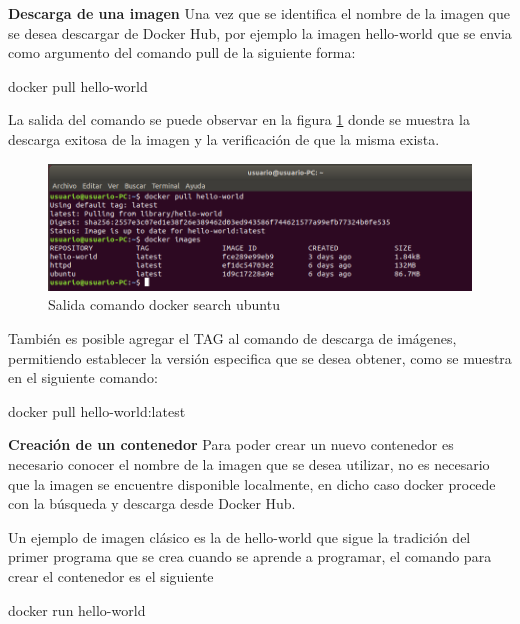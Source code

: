 \textbf{Descarga de una imagen}
Una vez que se identifica el nombre de la imagen que se desea descargar de Docker Hub, por ejemplo la imagen hello-world que se envia como argumento del comando pull de la siguiente forma:
\begin{commandshell} docker pull hello-world \end{commandshell}

La salida del comando se puede observar en la figura \ref{fig:DockerGestion5} donde se muestra la descarga exitosa de la imagen y la verificación de que la misma exista. 

\begin{figure}[!hbtp]
	\centering
	\includegraphics[width=\linewidth]{RE05_Docker/Gestion_basica/REDocker_Gestion5.png}
	\vspace{-0.2cm}
	\caption{Salida comando docker search ubuntu}
	\label{fig:DockerGestion5}
\end{figure}

También es posible agregar el TAG al comando de descarga de imágenes, permitiendo establecer la versión especifica que se desea obtener, como se muestra en el siguiente comando:

\begin{commandshell} docker pull hello-world:latest \end{commandshell}

\textbf{Creación de un contenedor}
Para poder crear un nuevo contenedor es necesario conocer el nombre de la imagen que se desea utilizar, no es necesario que la imagen se encuentre disponible localmente, en dicho caso docker procede con la búsqueda y descarga desde Docker Hub.  

Un ejemplo de imagen clásico es la de hello-world que sigue la tradición del primer programa que se crea cuando se aprende a programar, el comando para crear el contenedor es el siguiente

\begin{commandshell} docker run hello-world \end{commandshell}

